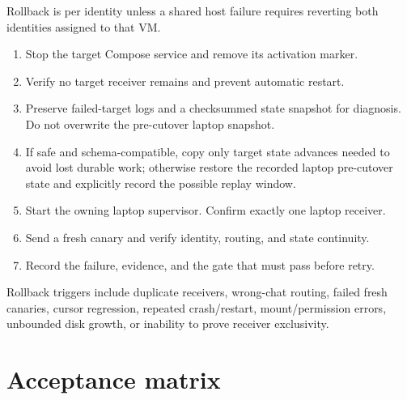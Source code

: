 \documentclass[11pt]{article}
\begin{document}
Rollback is per identity unless a shared host failure requires reverting both
identities assigned to that VM.

\begin{enumerate}
\item Stop the target Compose service and remove its activation marker.
\item Verify no target receiver remains and prevent automatic restart.
\item Preserve failed-target logs and a checksummed state snapshot for
diagnosis. Do not overwrite the pre-cutover laptop snapshot.
\item If safe and schema-compatible, copy only target state advances needed to
avoid lost durable work; otherwise restore the recorded laptop pre-cutover
state and explicitly record the possible replay window.
\item Start the owning laptop supervisor. Confirm exactly one laptop receiver.
\item Send a fresh canary and verify identity, routing, and state continuity.
\item Record the failure, evidence, and the gate that must pass before retry.
\end{enumerate}

Rollback triggers include duplicate receivers, wrong-chat routing, failed fresh
canaries, cursor regression, repeated crash/restart, mount/permission errors,
unbounded disk growth, or inability to prove receiver exclusivity.

\section{Acceptance matrix}
\end{document}
